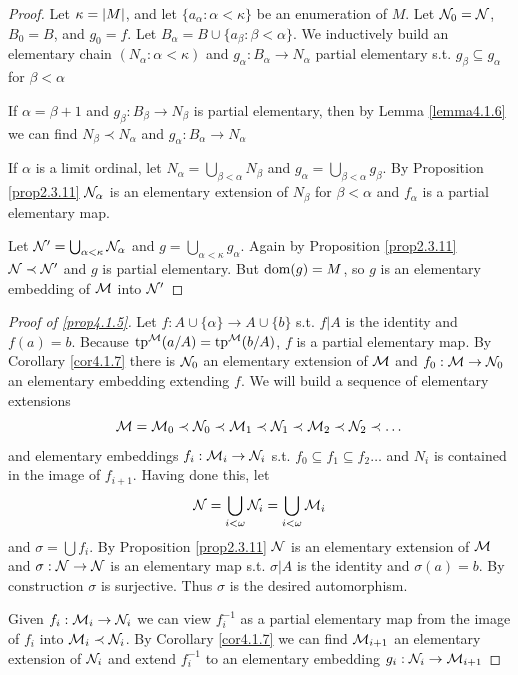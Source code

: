 \documentclass[11pt]{article}
\begin{document}
\begin{proof}
Let \(\kappa=\abs{M}\), and let \(\{a_\alpha:\alpha<\kappa\}\) be an enumeration of \(M\). Let \(\mathcal{N}_0=\mathcal{N}\), \(B_0=B\),
and \(g_0=f\). Let \(B_\alpha=B\cup\{a_\beta:\beta<\alpha\}\). We inductively build an elementary chain \((N_\alpha:\alpha<\kappa)\)
and \(g_\alpha:B_\alpha\to N_\alpha\) partial elementary s.t. \(g_\beta\subseteq g_\alpha\) for \(\beta<\alpha\)

If \(\alpha=\beta+1\) and \(g_\beta:B_\beta\to N_\beta\) is partial elementary, then by Lemma \ref{lemma4.1.6}  we can
find \(N_\beta\prec N_\alpha\) and \(g_\alpha:B_\alpha\to N_\alpha\)

If \(\alpha\) is a limit ordinal, let \(N_\alpha=\bigcup_{\beta<\alpha}N_\beta\) and \(g_\alpha=\bigcup_{\beta<\alpha}g_\beta\). By Proposition
\ref{prop2.3.11} \(\mathcal{N}_\alpha\) is an elementary extension of \(N_\beta\) for \(\beta<\alpha\) and \(f_\alpha\) is a partial
elementary map.

Let \(\mathcal{N}'=\bigcup_{\alpha<\kappa}\mathcal{N}_\alpha\) and \(g​=\bigcup_{\alpha<\kappa}g_\alpha\). Again by Proposition \ref{prop2.3.11} \(\mathcal{N}\prec\mathcal{N}'\)
and \(g\) is partial elementary. But \(\operatorname{dom}(g)=M\), so \(g\) is an elementary embedding of \(\mathcal{M}\)
into \(\mathcal{N}'\)
\end{proof}

\begin{proof}[Proof of \ref{prop4.1.5}]
Let \(f:A\cup\{\alpha\}\to A\cup\{b\}\) s.t. \(f|A\) is the identity and \(f(a)=b\).
Because \(\operatorname{tp}^{\mathcal{M}}(a/A)=\operatorname{tp}^{\mathcal{M}}(b/A)\), \(f\) is a partial elementary map. By Corollary
\ref{cor4.1.7} there is \(\mathcal{N}_0\) an elementary extension of \(\mathcal{M}\) and \(f_0:\mathcal{M}\to\mathcal{N}_0\) an elementary
embedding extending \(f\).  We will build a sequence of elementary extensions
\begin{equation*}
\mathcal{M}=\mathcal{M}_0\prec\mathcal{N}_0\prec\mathcal{M}_1\prec\mathcal{N}_1\prec\mathcal{M}_2\prec\mathcal{N}_2\prec\dots
\end{equation*}
and elementary embeddings \(f_i:\mathcal{M}_i\to\mathcal{N}_i\) s.t. \(f_0\subseteq f_1\subseteq f_2\dots\) and \(N_i\) is contained in the
image of \(f_{i+1}\). Having done this, let
\begin{equation*}
\mathcal{N}=\bigcup_{i<\omega}\mathcal{N}_i=\bigcup_{i<\omega}\mathcal{M}_i
\end{equation*}
and \(\sigma=\bigcup f_i\). By Proposition \ref{prop2.3.11} \(\mathcal{N}\) is an elementary extension of \(\mathcal{M}\)
and \(\sigma:\mathcal{N}\to\mathcal{N}\) is an elementary map s.t. \(\sigma|A\) is the identity and \(\sigma(a)=b\). By construction
\(\sigma\) is surjective. Thus \(\sigma\) is the desired automorphism.

Given \(f_i:\mathcal{M}_i\to\mathcal{N}_i\) we can view \(f_i^{-1}\) as a partial elementary map from the image of \(f_i\)
into \(\mathcal{M}_i\prec\mathcal{N}_i\). By Corollary \ref{cor4.1.7} we can find \(\mathcal{M}_{i+1}\) an elementary extension
of \(\mathcal{N}_i\) and extend \(f_i^{-1}\) to an elementary embedding \(g_i:\mathcal{N}_i\to\mathcal{M}_{i+1}\)
\end{proof}
\end{document}
